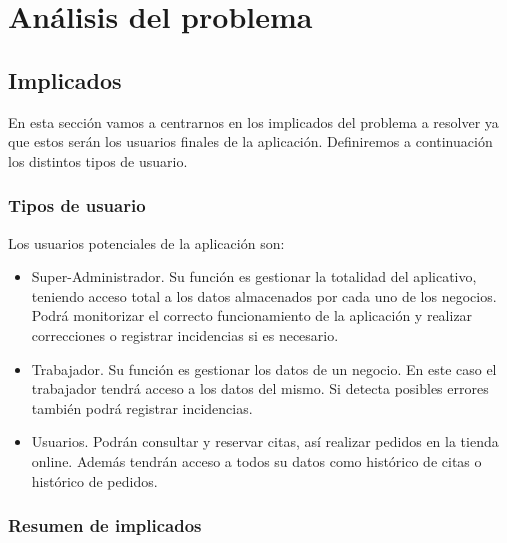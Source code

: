 \chapter{Análisis del problema}

\section{Implicados}

En esta sección vamos a centrarnos en los implicados del problema a resolver ya que estos serán los usuarios finales de
la aplicación. Definiremos a continuación los distintos tipos de usuario.

\subsection{Tipos de usuario}

Los usuarios potenciales de la aplicación son:

\begin{itemize}
    \item Super-Administrador. Su función es gestionar la totalidad del aplicativo, teniendo acceso total a los datos
    almacenados por cada uno de los negocios. Podrá monitorizar el correcto funcionamiento de la aplicación y realizar
    correcciones o registrar incidencias si es necesario.

    \item Trabajador. Su función es gestionar los datos de un negocio. En este caso el trabajador 
    tendrá acceso a los datos del mismo. Si detecta posibles errores también podrá registrar incidencias.

    \item Usuarios. Podrán consultar y reservar citas, así realizar pedidos en la tienda online.
    Además tendrán acceso a todos su datos como histórico de citas o histórico de pedidos.
\end{itemize}

\subsection{Resumen de implicados}

